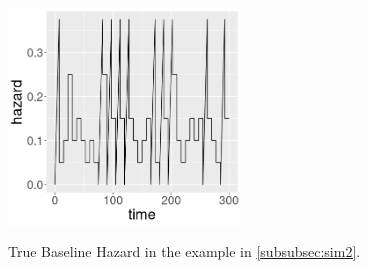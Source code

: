 \documentclass[ba]{imsart}
\begin{document}
\begin{figure}[ht]
\centering
\includegraphics[width=0.55\textwidth,height=2.5in]{true_base.png}
\caption{True Baseline Hazard in the example in \ref{subsubsec:sim2}.}
\label{fig:truebase}
\end{figure}
\end{document}

